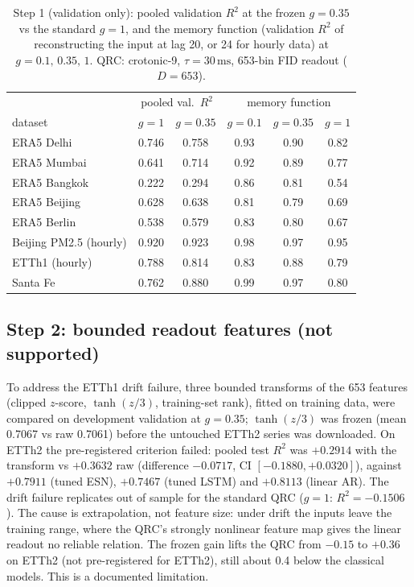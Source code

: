 \documentclass[aps,prresearch,preprint,superscriptaddress,amsmath,amssymb,floatfix]{revtex4-2}
\newcommand{\SI}[2]{\ensuremath{#1\,\mathrm{#2}}}
\begin{document}
\begin{table}[t]
\caption{\label{tab:gain}Step 1 (validation only): pooled validation $R^2$ at the frozen
$g=0.35$ vs the standard $g=1$, and the memory function (validation $R^2$ of
reconstructing the input at lag 20, or 24 for hourly data) at $g=0.1,\,0.35,\,1$. QRC:
crotonic-9, $\tau=\SI{30}{ms}$, 653-bin FID readout ($D=653$).}
\begin{ruledtabular}
\begin{tabular}{lccccc}
 & \multicolumn{2}{c}{pooled val.\ $R^2$} & \multicolumn{3}{c}{memory function} \\
dataset & $g=1$ & $g=0.35$ & $g=0.1$ & $g=0.35$ & $g=1$ \\ \colrule
ERA5 Delhi   & 0.746 & 0.758 & 0.93 & 0.90 & 0.82 \\
ERA5 Mumbai  & 0.641 & 0.714 & 0.92 & 0.89 & 0.77 \\
ERA5 Bangkok & 0.222 & 0.294 & 0.86 & 0.81 & 0.54 \\
ERA5 Beijing & 0.628 & 0.638 & 0.81 & 0.79 & 0.69 \\
ERA5 Berlin  & 0.538 & 0.579 & 0.83 & 0.80 & 0.67 \\
Beijing PM2.5 (hourly) & 0.920 & 0.923 & 0.98 & 0.97 & 0.95 \\
ETTh1 (hourly) & 0.788 & 0.814 & 0.83 & 0.88 & 0.79 \\
Santa Fe     & 0.762 & 0.880 & 0.99 & 0.97 & 0.80 \\
\end{tabular}
\end{ruledtabular}
\end{table}

\subsection{Step 2: bounded readout features (not supported)}
To address the ETTh1 drift failure, three bounded transforms of the 653 features
(clipped $z$-score, $\tanh(z/3)$, training-set rank), fitted on training data, were
compared on development validation at $g=0.35$; $\tanh(z/3)$ was frozen (mean 0.7067
vs raw 0.7061) before the untouched ETTh2 series was downloaded. On ETTh2 the
pre-registered criterion failed: pooled test $R^2$ was $+0.2914$ with the transform
vs $+0.3632$ raw (difference $-0.0717$, CI $[-0.1880,+0.0320]$), against
$+0.7911$ (tuned ESN), $+0.7467$ (tuned LSTM) and $+0.8113$ (linear AR). The drift
failure replicates out of sample for the standard QRC ($g=1$: $R^2=-0.1506$). The cause
is extrapolation, not feature size: under drift the inputs leave the training range,
where the QRC's strongly nonlinear feature map gives the linear readout no reliable
relation. The frozen gain lifts the QRC from $-0.15$ to $+0.36$ on ETTh2 (not
pre-registered for ETTh2), still about 0.4 below the classical models. This is a
documented limitation.
\end{document}
